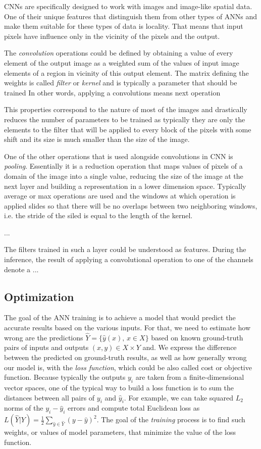 CNNs are specifically designed to work with images and image-like spatial data.
One of their unique features that distinguish them from other types of ANNs and make them suitable for these types of data is locality.
That means that input pixels have influence only in the vicinity of the pixels and the output.

The \textit{convolution} operations could be defined by obtaining a value of every element of the output image as a weighted sum of the values of input image elements of a region in vicinity of this output element.
The matrix defining the weights is called \textit{filter} or \textit{kernel} and is typically a parameter that should be trained
In other words, applying a convolutions means next operation

This properties correspond to the nature of most of the images and drastically reduces the number of parameters to be trained as typically they are only the elements to the filter that will be applied to every block of the pixels with some shift and its size is much smaller than the size of the image.

One of the other operations that is used alongside convolutions in CNN is \textit{pooling}.
Essentially it is a reduction operation that maps values of pixels of a domain of the image into a single value, reducing the size of the image at the next layer and building a representation in a lower dimension space. 
Typically average or max operations are used and the windows at which operation is applied slides so that there will be no overlaps between two neighboring windows, i.e. the stride of the siled is equal to the length of the kernel.

...


The filters trained in such a layer could be understood as features. 
During the inference, the result of applying a convolutional operation to one of the channels denote a ...


\subsection{Optimization}

The goal of the ANN training is to achieve a model that would predict the accurate results based on the various inputs.
For that, we need to estimate how wrong are the predictions $\hat{Y} = \{\hat{y}(x), \, x \in X \}$ based on known ground-truth pairs of inputs and outputs $ (x, y) \in X \times Y $ and.
We express the difference between the predicted on ground-truth results, as well as how generally wrong our model is, with the \textit{loss function}, which could be also called cost or objective function.
Because typically the outputs $y_{i}$ are taken from a finite-dimensional vector spaces, one of the typical way to build a loss function is to sum the distances between all pairs of $y_{i}$ and $\hat{y}_{i}$.
For example, we can take squared $L_{2}$ norms of the $y_{i}-\hat{y}_{i}$ errors and compute total Euclidean loss as $ L(\hat{Y}|Y) = \frac{1}{2}\sum_{\hat{y} \in \hat{Y}}(y - \hat{y})^{2} $.
The goal of the \textit{training} process is to find such weights, or values of model parameters, that minimize the value of the loss function.

